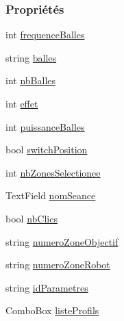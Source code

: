 \subsubsection*{Propriétés}
\begin{DoxyCompactItemize}
\item 
int \hyperlink{class_fenetre_reglages_ae8e9226deca2cea7e83938761c366fbe}{frequence\+Balles}
\item 
string \hyperlink{class_fenetre_reglages_ac357cda98e36cd86dd144786288e5d2c}{balles}
\item 
int \hyperlink{class_fenetre_reglages_a80b5872af04bd08547e1565e80ae68e7}{nb\+Balles}
\item 
int \hyperlink{class_fenetre_reglages_a00dc56e033663f635e9f10efa98c855c}{effet}
\item 
int \hyperlink{class_fenetre_reglages_a442ad111a0b8a892218fd3028dd83716}{puissance\+Balles}
\item 
bool \hyperlink{class_fenetre_reglages_aea71275ec9f3fece52a0db20990a8642}{switch\+Position}
\item 
int \hyperlink{class_fenetre_reglages_a19033cfeabd66f4a005aa4b7053e24d1}{nb\+Zones\+Selectionee}
\item 
Text\+Field \hyperlink{class_fenetre_reglages_aabe223f7c68abf798bba9ebd655c3426}{nom\+Seance}
\item 
bool \hyperlink{class_fenetre_reglages_ae821675c0a6d00355f7fb4da96468157}{nb\+Clics}
\item 
string \hyperlink{class_fenetre_reglages_a6f4416ce1c123e2638352d490d4b7df0}{numero\+Zone\+Objectif}
\item 
string \hyperlink{class_fenetre_reglages_ae28f25c35a8c5379639b77805623f1b2}{numero\+Zone\+Robot}
\item 
string \hyperlink{class_fenetre_reglages_ac0c90bd75c6a3cc223a7cc4e99e7a731}{id\+Parametres}
\item 
Combo\+Box \hyperlink{class_fenetre_reglages_a9d46d42468b9dc6c6e8308309ae109bb}{liste\+Profils}
\end{DoxyCompactItemize}
